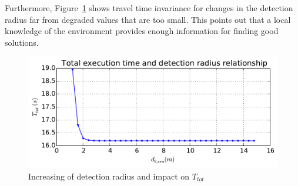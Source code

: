 \documentclass[eprint]{actapoly}
\begin{document}
Furthermore, Figure~\ref{fig:drhotot} shows travel time
invariance for changes in the detection radius far from degraded values that are too small.
This points out that a local knowledge of the environment provides enough information for finding good solutions.
\begin{figure}[!h]\centering
  \includegraphics[width=\linewidth]{./images/drho/drho-tot.pdf}
  \caption{Increasing of detection radius and impact on
  $T_{tot}$\label{fig:drhotot}}
\end{figure}

%
%
%
\end{document}
